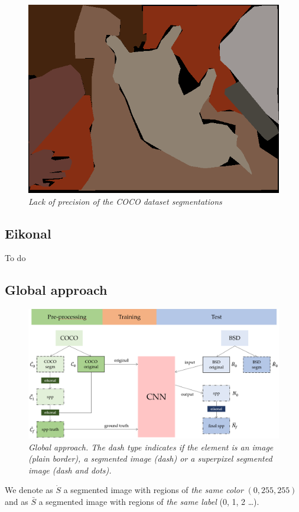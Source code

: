 \documentclass{article}
\begin{document}
        \begin{figure}[!ht]
            \centering
            \includegraphics[width=0.3\linewidth]{pics/img_segm_coco.png}
            \caption{\textit{Lack of precision of the COCO dataset segmentations}}
            \label{fig:imprecise}
        \end{figure}

    \subsection{Eikonal}
        To do
    \subsection{Global approach}
        \begin{figure}[!ht]
            \centering
            \includegraphics[width=\linewidth]{pics/schema-global.png}
            \caption{\textit{Global approach. The dash type indicates if the element is an image (plain border), a segmented image (dash) or a superpixel segmented image (dash and dots).}}
        \end{figure}
        \par
        We denote as $\dot S$ a segmented image with regions of \textit{the same color} $(0, 255, 255)$  and as $\bar S$ a segmented image with regions of \textit{the same label} (0, 1, 2 \dots).
\end{document}
